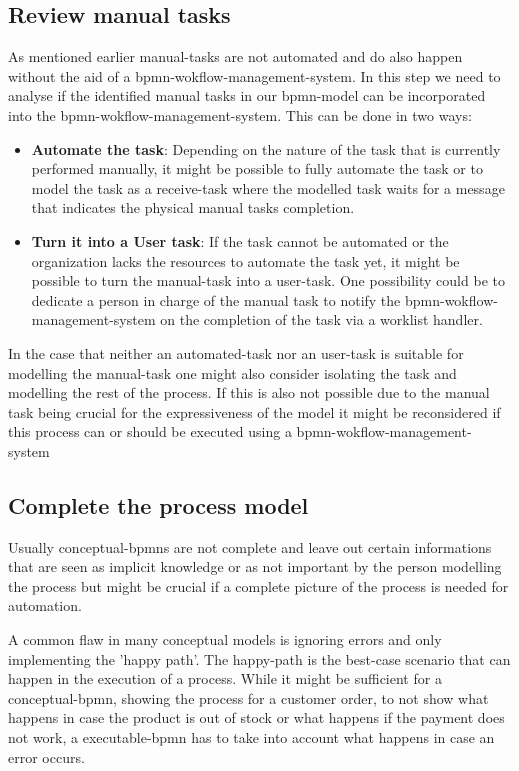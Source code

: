 \subsection{Review manual tasks}\label{manual}
As mentioned earlier \gls{manual-task}s are not automated and do also happen without the aid of a \gls{bpmn-wokflow-management-system}. In this step we need to analyse if the identified manual tasks in our \gls{bpmn}-model can be incorporated into the \gls{bpmn-wokflow-management-system}. This can be done in two ways:
\begin{itemize}
	\item \textbf{Automate the task}: Depending on the nature of the task that is currently performed manually, it might be possible to fully automate the task or to model the task as a \gls{receive-task} where the modelled task waits for a message that indicates the physical manual tasks completion.
	\item \textbf{Turn it into a User task}: If the task cannot be automated or the organization lacks the resources to automate the task yet, it might be possible to turn the \gls{manual-task} into a \gls{user-task}. One possibility could be to dedicate a person in charge of the manual task to notify the \gls{bpmn-wokflow-management-system} on the completion of the task via a worklist handler. \cite{stefanov2014business}
\end{itemize}

In the case that neither an \gls{automated-task} nor an \gls{user-task} is suitable for modelling the \gls{manual-task} one might also consider isolating the task and modelling the rest of the process. If this is also not possible due to the manual task being crucial for the expressiveness of the model it might be reconsidered if this process can or should be executed using a \gls{bpmn-wokflow-management-system}\cite[p.~228]{freund2019real}

\subsection{Complete the process model}\label{complete}
Usually \gls{conceptual-bpmn}s are not complete and leave out certain informations that are seen as implicit knowledge or as not important by the person modelling the process but might be crucial if a complete picture of the process is needed for automation. 

A common flaw in many conceptual models is ignoring errors and only implementing the 'happy path'. The \gls{happy-path} is the best-case scenario that can happen in the execution of a process. While it might be sufficient for a \gls{conceptual-bpmn}, showing the process for a customer order, to not show what happens in case the product is out of stock or what happens if the payment does not work, a \gls{executable-bpmn} has to take into account what happens in case an error occurs. 

